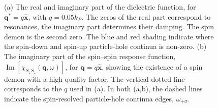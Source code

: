 \documentclass[aps,prl,reprint,twocolumns,superscriptaddress]{revtex4-2}
\DeclareMathOperator{\Imm}{Im}
\newcommand{\xx}{\hat{\bm{x}}}
\newcommand{\kF}{k_{F}}
\newenvironment{DIFnomarkup}{}{} %
\begin{document}
\begin{DIFnomarkup}
	
	\begin{figure}
		\caption{(a) The real and imaginary part of the dielectric function, for $\bm q^* = q \hat{\bm x}$, with $q=0.05\kF$. The zeros of the real part correspond to resonances, the imaginary part determines their damping. The spin demon is the second zero. The blue and red shading indicate where the spin-down and spin-up particle-hole continua is non-zero. (b)  The imaginary part of the spin–spin response function, $\Imm[\chi_{S_zS_z}(\bm q,\omega)]$, for $\bm q=q\xx$, showing the existence of a spin demon with a high quality factor. The vertical dotted line corresponds to the $q$ used in (a). In both (a,b), the dashed lines indicate the spin-resolved particle-hole continua edges, $\omega_{+\sigma}$.\label{fig:alongx} }
	\end{figure}
	\end{DIFnomarkup}
\end{document}
